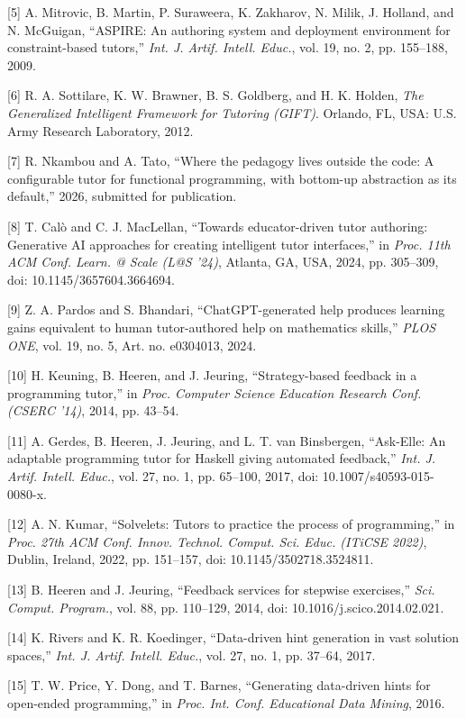 \documentclass[10pt,twocolumn,letterpaper]{article}
\begin{document}
[5] A. Mitrovic, B. Martin, P. Suraweera, K. Zakharov, N. Milik, J.
Holland, and N. McGuigan, ``ASPIRE: An authoring system and deployment
environment for constraint-based tutors,'' \emph{Int. J. Artif. Intell. Educ.}, vol. 19, no. 2, pp. 155--188, 2009.

[6] R. A. Sottilare, K. W. Brawner, B. S. Goldberg, and H. K.
Holden, \emph{The Generalized Intelligent Framework for Tutoring
(GIFT)}. Orlando, FL, USA: U.S. Army Research Laboratory, 2012.

[7] R. Nkambou and A. Tato, ``Where the pedagogy lives outside the
code: A configurable tutor for functional programming, with bottom-up
abstraction as its default,'' 2026, submitted for publication.

[8] T. Cal\`o and C. J. MacLellan, ``Towards educator-driven tutor
authoring: Generative AI approaches for creating intelligent tutor
interfaces,'' in \emph{Proc. 11th ACM Conf. Learn. @ Scale (L@S '24)},
Atlanta, GA, USA, 2024, pp. 305--309, doi: 10.1145/3657604.3664694.

[9] Z. A. Pardos and S. Bhandari, ``ChatGPT-generated help produces
learning gains equivalent to human tutor-authored help on mathematics
skills,'' \emph{PLOS ONE}, vol. 19, no. 5, Art. no. e0304013, 2024.

[10] H. Keuning, B. Heeren, and J. Jeuring, ``Strategy-based feedback in
a programming tutor,'' in \emph{Proc. Computer Science Education Research
Conf. (CSERC '14)}, 2014, pp. 43--54.

[11] A. Gerdes, B. Heeren, J. Jeuring, and L. T. van Binsbergen,
``Ask-Elle: An adaptable programming tutor for Haskell giving automated
feedback,'' \emph{Int. J. Artif. Intell. Educ.}, vol. 27, no. 1,
pp. 65--100, 2017, doi: 10.1007/s40593-015-0080-x.

[12] A. N. Kumar, ``Solvelets: Tutors to practice the process of
programming,'' in \emph{Proc. 27th ACM Conf. Innov. Technol. Comput.
Sci. Educ. (ITiCSE 2022)}, Dublin, Ireland, 2022, pp. 151--157,
doi: 10.1145/3502718.3524811.

[13] B. Heeren and J. Jeuring, ``Feedback services for stepwise
exercises,'' \emph{Sci. Comput. Program.}, vol. 88, pp. 110--129, 2014, doi: 10.1016/j.scico.2014.02.021.

[14] K. Rivers and K. R. Koedinger, ``Data-driven hint generation in
vast solution spaces,'' \emph{Int. J. Artif. Intell. Educ.}, vol. 27, no. 1, pp. 37--64, 2017.

[15] T. W. Price, Y. Dong, and T. Barnes, ``Generating data-driven
hints for open-ended programming,'' in \emph{Proc. Int. Conf.
Educational Data Mining}, 2016.
\end{document}

